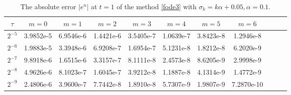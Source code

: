 \documentclass[10pt]{siamltex}
\begin{document}
\begin{table}[!h]
\caption{{The  absolute  error   $|e^n|$ at $t=1$
of the method \eqref{fode3}  with   $\sigma_k=k\alpha+0.05,\alpha=0.1$.}}\label{tb6-5-2}
\centering\footnotesize
\begin{tabular}{|c|c|c|c|c|c|c|c|c|c|c|}
\hline
 $\tau$ & $m=0$ & $m=1$ & $m=2$ &$m=3$ & $m=4$ &$m=5$  & $m=6$   \\
 \hline
$2^{-5}$&3.9852e-5&6.9546e-6&1.4421e-6&3.5405e-7&1.0639e-7&3.8423e-8&1.2946e-8  \\
$2^{-6}$&1.9883e-5&3.3948e-6&6.9208e-7&1.6954e-7&5.1231e-8&1.8212e-8&6.2020e-9  \\
$2^{-7}$&9.8918e-6&1.6515e-6&3.3157e-7&8.1111e-8&2.4573e-8&8.6205e-9&2.9998e-9  \\
$2^{-8}$&4.9626e-6&8.1023e-7&1.6045e-7&3.9212e-8&1.1887e-8&4.1314e-9&1.4772e-9  \\
$2^{-9}$&2.4806e-6&3.9600e-7&7.7442e-8&1.8910e-8&5.7307e-9&1.9807e-9&7.2870e-10 \\
\hline
\end{tabular}
\end{table}
\end{document}
